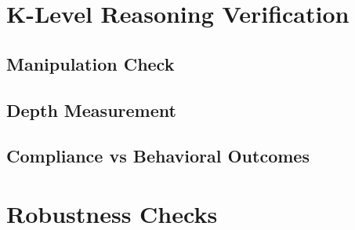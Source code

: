 \section{K-Level Reasoning Verification}

\subsection{Manipulation Check}

\subsection{Depth Measurement}

\subsection{Compliance vs Behavioral Outcomes}

\section{Robustness Checks}

